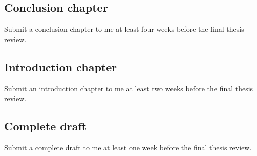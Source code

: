\documentclass[
]{book}
\begin{document}
\hypertarget{conclusion-chapter}{%
\subsection{Conclusion chapter}\label{conclusion-chapter}}

Submit a conclusion chapter to me at least four weeks before the final thesis review.

\hypertarget{introduction-chapter}{%
\subsection{Introduction chapter}\label{introduction-chapter}}

Submit an introduction chapter to me at least two weeks before the final thesis review.

\hypertarget{complete-draft}{%
\subsection{Complete draft}\label{complete-draft}}

Submit a complete draft to me at least one week before the final thesis review.

  
\end{document}
